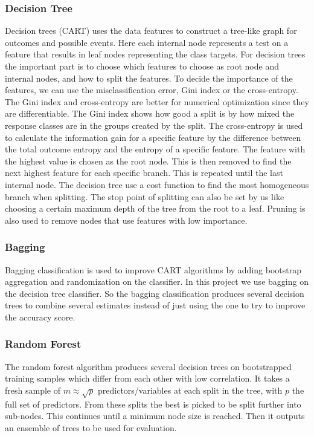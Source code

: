 \documentclass[12pt,a4paper,english]{article}
\begin{document}
\subsubsection{Decision Tree}
\label{subsubsect:Tree}
Decision trees (CART) uses the data features to construct a tree-like graph for outcomes and possible events. Here each internal node represents a test on a feature that results in leaf nodes representing the class targets. For decision trees the important part is to choose which features to choose as root node and internal nodes, and how to split the features. To decide the importance of the features, we can use the misclassification error, Gini index or the cross-entropy. The Gini index and cross-entropy are better for numerical optimization since they are differentiable. The Gini index shows how good a split is by how mixed the response classes are in the groups created by the split. The cross-entropy is used to calculate the information gain for a specific feature by the difference between the total outcome entropy and the entropy of a specific feature. The feature with the highest value is chosen as the root node. This is then removed to find the next highest feature for each specific branch. This is repeated until the last internal node. The decision tree use a cost function to find the most homogeneous branch when splitting. The stop point of splitting can also be set by us like choosing a certain maximum depth of the tree from the root to a leaf. Pruning is also used to remove nodes that use features with low importance.

\subsubsection{Bagging}
\label{subsubsect:Bag}
Bagging classification is used to improve CART algorithms by adding bootstrap aggregation and randomization on the classifier. In this project we use bagging on the decision tree classifier. So the bagging classification produces several decision trees to combine several estimates instead of just using the one to try to improve the accuracy score.

\subsubsection{Random Forest}
\label{subsubsect:Forest}
The random forest algorithm produces several decision trees on bootstrapped training samples which differ from each other with low correlation. It takes a fresh sample of $m\approx\sqrt{p}$ predictors/variables at each split in the tree, with $p$ the full set of predictors. From these splits the best is picked to be split further into sub-nodes. This continues until a minimum node size is reached. Then it outputs an ensemble of trees to be used for evaluation.
\end{document}
